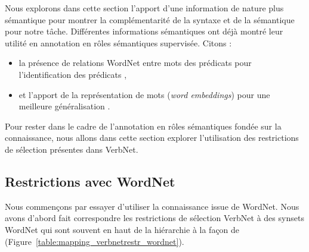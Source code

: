 Nous explorons dans cette section l'apport d'une information de nature plus
sémantique pour montrer la complémentarité de la syntaxe et de la sémantique
pour notre tâche. Différentes informations sémantiques ont déjà montré leur
utilité en annotation en rôles sémantiques supervisée. Citons :

\begin{itemize}
    \item la présence de relations WordNet entre mots des prédicats pour
        l'identification des prédicats \citep{das2010probabilistic},
    \item et l'apport de la représentation de mots (\textit{word embeddings})
        pour une meilleure généralisation \citep{lechelle2014utilisation}.
\end{itemize}

Pour rester dans le cadre de l'annotation en rôles sémantiques fondée sur la
connaissance, nous allons dans cette section explorer l'utilisation des
restrictions de sélection présentes dans VerbNet.

\subsection{Restrictions avec WordNet}
\label{restrictions_wordnet}

Nous commençons par essayer d'utiliser la connaissance issue de WordNet.  Nous
avons d'abord fait correspondre les restrictions de sélection VerbNet à des
synsets WordNet qui sont souvent en haut de la hiérarchie à la façon de
\citep{shi2005putting} (Figure~\ref{table:mapping_verbnetrestr_wordnet}).

